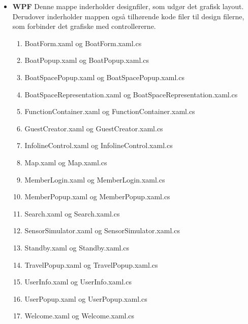\begin{itemize}
	\item \textbf{WPF} Denne mappe inderholder designfiler, som udgør det grafisk layout. Derudover inderholder mappen også tilhørende kode filer til design filerne, som forbinder det grafiske med controllererne.
		\begin{enumerate}
			\item BoatForm.xaml og BoatForm.xaml.cs
			\item BoatPopup.xaml og BoatPopup.xaml.cs
			\item BoatSpacePopup.xaml og BoatSpacePopup.xaml.cs
			\item BoatSpaceRepresentation.xaml og BoatSpaceRepresentation.xaml.cs
			\item FunctionContainer.xaml og FunctionContainer.xaml.cs
			\item GuestCreator.xaml og GuestCreator.xaml.cs
			\item InfolineControl.xaml og InfolineControl.xaml.cs
			\item Map.xaml og Map.xaml.cs
			\item MemberLogin.xaml og MemberLogin.xaml.cs
			\item MemberPopup.xaml og MemberPopup.xaml.cs
			\item Search.xaml og Search.xaml.cs
			\item SensorSimulator.xaml og SensorSimulator.xaml.cs
			\item Standby.xaml og Standby.xaml.cs
			\item TravelPopup.xaml og TravelPopup.xaml.cs
			\item UserInfo.xaml og UserInfo.xaml.cs
			\item UserPopup.xaml og UserPopup.xaml.cs
			\item Welcome.xaml og Welcome.xaml.cs
		\end{enumerate}
\end{itemize}